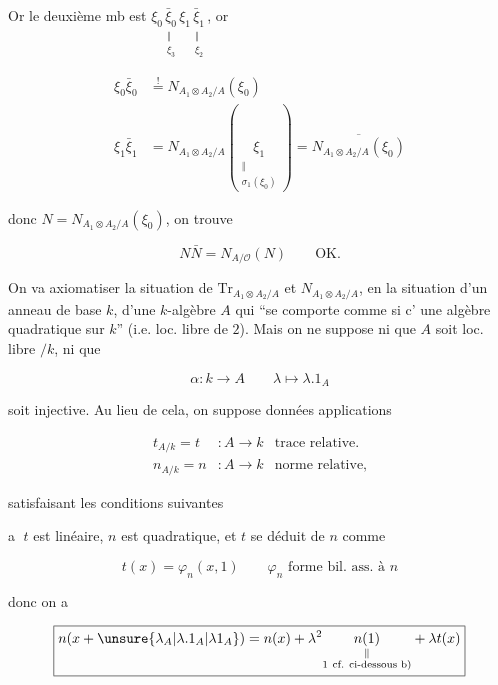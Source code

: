 
Or le deuxième mb est $\xi_0\underset{\substack{\Vert\\\xi_3}}{\bar\xi_0}\xi_1\underset{\substack{\Vert\\\xi_2}}{\bar\xi_1}$, or

\[
\begin{aligned}
\xi_0\bar\xi_0&\overset{!}{=}N_{A_1\otimes A_2/A}(\xi_0)\\
\xi_1\bar\xi_1&=N_{A_1\otimes A_2/A}(\underset{\substack{\Vert\\\sigma_1(\xi_0)}}{\xi_1})
=\overline{N_{A_1\otimes A_2/A}(\xi_0)}
\end{aligned}
\]

donc  $N=N_{A_1\otimes A_2/A}(\xi_0)$, on trouve

\[
N\bar N=N_{A/\mathcal O}(N)\qquad\text{OK.}
\]


On va axiomatiser la situation de  $\mathrm{Tr}_{A_1\otimes A_2/A}$ et $N_{A_1\otimes A_2/A}$, en  la situation d'un anneau de base $k$,  d'une $k$-algèbre $A$ qui ``se comporte comme si c' une algèbre quadratique sur $k$'' (i.e. loc. libre de  $2$). Mais on ne suppose ni que $A$ soit loc. libre   $/k$, ni que

\[
\alpha:k\longrightarrow A\qquad\lambda\longmapsto\lambda.1_A
\]

soit injective. Au lieu de cela, on suppose données  applications

\[
\begin{aligned}
t_{A/k}=t &: A\longrightarrow k &\text{trace relative.}\\
n_{A/k}=n &: A\longrightarrow k &\text{norme relative,}
\end{aligned}
\]

satisfaisant les conditions suivantes

\textcircled{a} $t$ est linéaire, $n$ est quadratique, et $t$ se déduit de $n$ comme

\[
t(x)=\varphi_n(x,1)\qquad\text{$\varphi_n$ forme bil. ass. à $n$}
\]

donc on a 

\[
\boxed{n(x+\unsure{\lambda_A|\lambda.1_A|\lambda1_A})=n(x)+\lambda^2\underset{\substack{\Vert\\1\ \text{cf. ci-dessous b)}}}{n(1)}+\lambda t(x)}
\]


